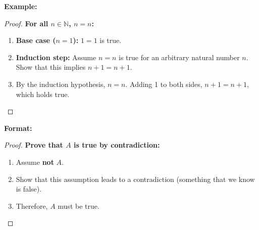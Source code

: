 \textbf{Example:}
\begin{proof}
\textbf{For all \(n \in \mathbb{N}\), \(n = n\):}
\begin{enumerate}
    \item \textbf{Base case (\(n = 1\)):} \(1 = 1\) is true.
    \item \textbf{Induction step:} Assume \(n = n\) is true for an arbitrary natural number \(n\). Show that this implies \(n + 1 = n + 1\).
    \item By the induction hypothesis, \(n = n\). Adding 1 to both sides, \(n + 1 = n + 1\), which holds true.
\end{enumerate}
\end{proof}

\textbf{Format:}
\begin{proof}
\textbf{Prove that \(A\) is true by contradiction:}
\begin{enumerate}
    \item Assume \textbf{not} \(A\).
    \item Show that this assumption leads to a contradiction (something that we know is false).
    \item Therefore, \(A\) must be true.
\end{enumerate}
\end{proof}

